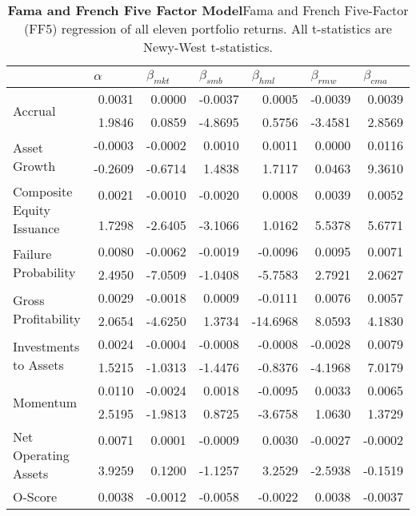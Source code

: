 \begin{table}[htbp]
\centering
\scriptsize
\caption[Fama and French Five Factor Model]{\textbf{Fama and French Five Factor Model}\newline Fama and French Five-Factor (FF5) regression of all eleven portfolio returns. All t-statistics are Newy-West t-statistics.}
\label{tab:ff5}
\begin{tabular}{@{}lrrrrrr@{}}
\toprule
& \multicolumn{1}{l}{$\alpha$} & \multicolumn{1}{l}{$\beta_{mkt}$} & \multicolumn{1}{l}{$\beta_{smb}$} & \multicolumn{1}{l}{$\beta_{hml}$} & \multicolumn{1}{l}{$\beta_{rmw}$} & \multicolumn{1}{l}{$\beta_{cma}$} \\ \midrule
\multirow{2}{*}{Accrual} & 0.0031 & 0.0000 & -0.0037 & 0.0005 & -0.0039 & 0.0039 \\
& 1.9846 & 0.0859 & -4.8695 & 0.5756 & -3.4581 & 2.8569 \\
\multirow{2}{*}{Asset Growth} & -0.0003 & -0.0002 & 0.0010 & 0.0011 & 0.0000 & 0.0116 \\
& -0.2609 & -0.6714 & 1.4838 & 1.7117 & 0.0463 & 9.3610 \\
\multirow{2}{*}{Composite Equity Issuance} & 0.0021 & -0.0010 & -0.0020 & 0.0008 & 0.0039 & 0.0052 \\
& 1.7298 & -2.6405 & -3.1066 & 1.0162 & 5.5378 & 5.6771 \\
\multirow{2}{*}{Failure Probability} & 0.0080 & -0.0062 & -0.0019 & -0.0096 & 0.0095 & 0.0071 \\
& 2.4950 & -7.0509 & -1.0408 & -5.7583 & 2.7921 & 2.0627 \\
\multirow{2}{*}{Gross Profitability} & 0.0029 & -0.0018 & 0.0009 & -0.0111 & 0.0076 & 0.0057 \\
& 2.0654 & -4.6250 & 1.3734 & -14.6968 & 8.0593 & 4.1830 \\
\multirow{2}{*}{Investments to Assets} & 0.0024 & -0.0004 & -0.0008 & -0.0008 & -0.0028 & 0.0079 \\
& 1.5215 & -1.0313 & -1.4476 & -0.8376 & -4.1968 & 7.0179 \\
\multirow{2}{*}{Momentum} & 0.0110 & -0.0024 & 0.0018 & -0.0095 & 0.0033 & 0.0065 \\
& 2.5195 & -1.9813 & 0.8725 & -3.6758 & 1.0630 & 1.3729 \\
\multirow{2}{*}{Net Operating Assets} & 0.0071 & 0.0001 & -0.0009 & 0.0030 & -0.0027 & -0.0002 \\
& 3.9259 & 0.1200 & -1.1257 & 3.2529 & -2.5938 & -0.1519 \\
\multirow{2}{*}{O-Score} & 0.0038 & -0.0012 & -0.0058 & -0.0022 & 0.0038 & -0.0037 \\

\end{tabular}
\end{table}
